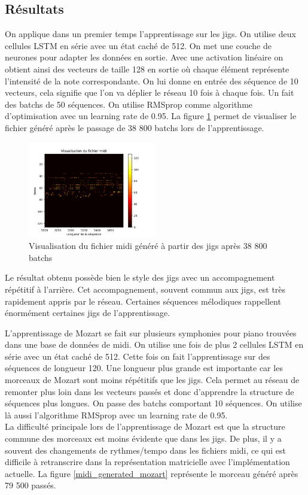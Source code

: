 \subsection{Résultats}
On applique dans un premier temps l'apprentissage sur les jigs. On utilise deux cellules LSTM en série avec un état caché de 512. On met une couche de neurones pour adapter les données en sortie. Avec une activation linéaire on obtient ainsi des vecteurs de taille 128 en sortie où chaque élément représente l'intensité de la note correspondante. On lui donne en entrée des séquence de 10 vecteurs, cela signifie que l'on va déplier le réseau 10 fois à chaque fois. Un fait des batchs de 50 séquences. On utilise RMSprop comme algorithme d'optimisation avec un learning rate de 0.95. La figure \ref{midi_generated_jigs} permet de visualiser le fichier généré après le passage de 38 800 batchs lors de l'apprentissage.

\begin{figure}[!ht]
  \centering
  \includegraphics[width=0.5\textwidth]{images/chapter9/midi_generated_jigs_38800.png}
  \caption{Visualisation du fichier midi généré à partir des jigs après 38 800 batchs}
    \label{midi_generated_jigs}
\end{figure}
Le résultat obtenu possède bien le style des jigs avec un accompagnement répétitif à l'arrière. Cet accompagnement, souvent commun aux jigs, est très rapidement appris par le réseau. Certaines séquences mélodiques rappellent énormément certaines jigs de l'apprentissage.

\vspace{2cm}

L'apprentissage de Mozart se fait sur plusieurs symphonies pour piano trouvées dans une base de données de midi. On utilise une fois de plus 2 cellules LSTM en série avec un état caché de 512. Cette fois on fait l'apprentissage sur des séquences de longueur 120. Une longueur plus grande est importante car les morceaux de Mozart sont moins répétitifs que les jigs. Cela permet au réseau de remonter plus loin dans les vecteurs passés et donc d'apprendre la structure de séquences plus longues. On passe des batchs comportant 10 séquences. On utilise là aussi l'algorithme RMSprop avec un learning rate de 0.95. \\
La difficulté principale lors de l'apprentissage de Mozart est que la structure commune des morceaux est moins évidente que dans les jigs. De plus, il y a souvent des changements de rythmes/tempo dans les fichiers midi, ce qui est difficile à retranscrire dans la représentation matricielle avec l'implémentation actuelle. La figure \ref{midi_generated_mozart} représente le morceau généré après 79 500 passés.

